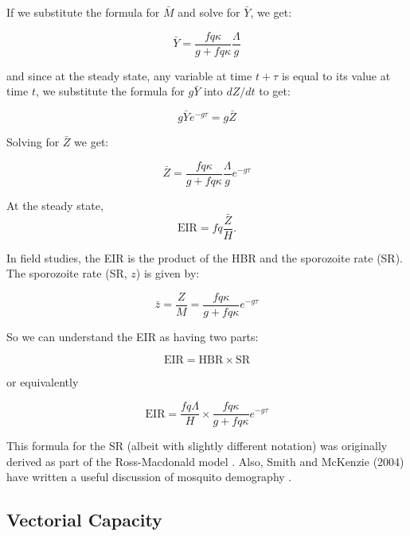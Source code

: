 \documentclass[
]{book}
\begin{document}
If we substitute the formula for \(\bar M\) and solve for \(\bar Y\), we get:

\begin{equation}
\bar Y = \frac{fq\kappa}{g + fq\kappa} \frac{\Lambda}{g}
\end{equation}

and since at the steady state, any variable at time \(t+\tau\) is equal to its value at time \(t\), we substitute the formula for \(g \bar Y\) into \(dZ/dt\) to get:

\begin{equation}
g \bar Y e^{-g\tau} = g \bar Z
\end{equation}

Solving for \(\bar Z\) we get:

\begin{equation}
\bar Z =  \frac{f q \kappa}{g + fq \kappa} \frac{\Lambda}{g} e^{-g\tau} 
\end{equation}

At the steady state, \[\mbox{EIR} = fq \frac{\bar Z}{H}.\]

In field studies, the EIR is the product of the HBR and the sporozoite rate (SR). The sporozoite rate (SR, \(z\)) is given by:

\begin{equation}
\bar z =  \frac{Z}{M} = \frac{f q \kappa}{g + fq \kappa} e^{-g\tau} 
\end{equation}

So we can understand the EIR as having two parts:

\begin{equation}
\mbox{EIR} = \mbox{HBR} \times  \mbox{SR} 
\end{equation}

or equivalently

\begin{equation}
\mbox{EIR} = \frac{\textstyle{fq\Lambda}}{\textstyle{H}} \times \frac{\textstyle{f q \kappa}}{\textstyle{g + fq \kappa}} e^{-g\tau} 
\end{equation}

This formula for the SR (albeit with slightly different notation) was originally derived as part of the Ross-Macdonald model \autocite{MacdonaldG1952Sporozoite,ArmitageP1953}. Also, Smith and McKenzie (2004) have written a useful discussion of mosquito demography \autocite{SmithDL2004Statics}.

\subsection{Vectorial Capacity}\label{vectorial-capacity-2}
\end{document}
